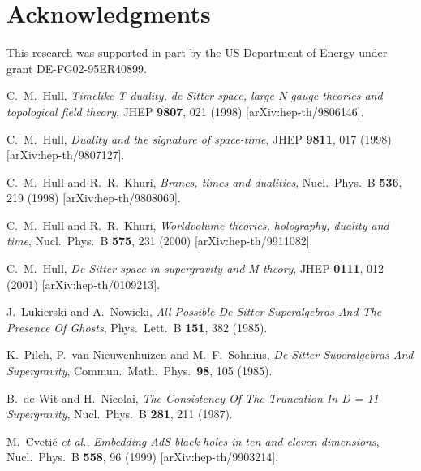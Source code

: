 \documentclass[a4paper,12pt]{article}
\begin{document}
\section*{Acknowledgments}

This research was supported in part by the US Department of Energy under
grant DE-FG02-95ER40899.

\begin{thebibliography}{99}

C.~M.~Hull,
{\sl Timelike T-duality, de Sitter space, large N gauge theories and
topological field theory},
JHEP {\bf 9807}, 021 (1998) [arXiv:hep-th/9806146].

C.~M.~Hull,
{\sl Duality and the signature of space-time},
JHEP {\bf 9811}, 017 (1998) [arXiv:hep-th/9807127].

C.~M.~Hull and R.~R.~Khuri,
{\sl Branes, times and dualities},
Nucl.\ Phys.\ B {\bf 536}, 219 (1998) [arXiv:hep-th/9808069].

C.~M.~Hull and R.~R.~Khuri,
{\sl Worldvolume theories, holography, duality and time},
Nucl.\ Phys.\ B {\bf 575}, 231 (2000) [arXiv:hep-th/9911082].

C.~M.~Hull,
{\sl De Sitter space in supergravity and M theory},
JHEP {\bf 0111}, 012 (2001) [arXiv:hep-th/0109213].

J.~Lukierski and A.~Nowicki,
{\sl All Possible De Sitter Superalgebras And The Presence Of Ghosts},
Phys.\ Lett.\ B {\bf 151}, 382 (1985).

K.~Pilch, P.~van Nieuwenhuizen and M.~F.~Sohnius,
{\sl De Sitter Superalgebras And Supergravity},
Commun.\ Math.\ Phys.\  {\bf 98}, 105 (1985).

B.~de Wit and H.~Nicolai,
{\sl The Consistency Of The \coordHE{} Truncation In D = 11 Supergravity},
Nucl.\ Phys.\ B {\bf 281}, 211 (1987).

M.~Cveti\v{c} {\it et al.},
{\sl Embedding AdS black holes in ten and eleven dimensions},
Nucl.\ Phys.\ B {\bf 558}, 96 (1999) [arXiv:hep-th/9903214].


\end{thebibliography}
\end{document}
